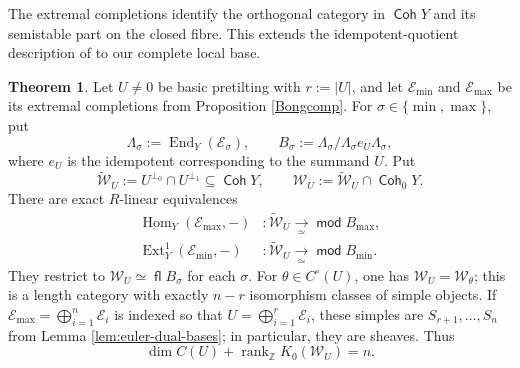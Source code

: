 \documentclass[a4paper,reqno]{amsart}
\def\E{\mathcal{E}}
\def\W{\mathcal{W}}
\DeclareMathOperator{\md}{\mathsf{mod}}
\renewcommand{\mod}{\md}
\DeclareMathOperator{\fl}{\mathsf{fl}}
\DeclareMathOperator{\Coh}{\mathsf{Coh}}
\DeclareMathOperator{\Hom}{Hom}
\DeclareMathOperator{\End}{End}
\DeclareMathOperator{\Ext}{Ext}
\theoremstyle{definition}
\newtheorem{Thm}{Theorem}[section]
\begin{document}
The extremal completions identify the orthogonal category in $\Coh Y$ and its semistable part on the closed fibre. This extends the idempotent-quotient description of \cite[Proposition 4.1]{Asa21} to our complete local base.

\begin{Thm}\label{thm:semistable-reduction}
Let $U\ne0$ be basic pretilting with $r:=|U|$, and let $\E_{\min}$ and $\E_{\max}$ be its extremal completions from Proposition \ref{Bongcomp}. For $\sigma\in\{\min,\max\}$, put
\[
\Lambda_\sigma:=\End_Y(\E_\sigma),
\qquad
B_\sigma:=\Lambda_\sigma/\Lambda_\sigma e_U\Lambda_\sigma,
\]
where $e_U$ is the idempotent corresponding to the summand $U$. Put
\[
\widetilde{\W}_U:=U^{\perp_0}\cap U^{\perp_1}\subseteq\Coh Y,
\qquad
\W_U:=\widetilde{\W}_U\cap\Coh_0Y.
\]
There are exact $R$-linear equivalences
\begin{equation}\label{eq:semistable-reduction-equivalences}
\begin{aligned}
\Hom_Y(\E_{\max},-)&\colon\widetilde{\W}_U\xrightarrow[\simeq]{}\mod B_{\max},\\
\Ext_Y^1(\E_{\min},-)&\colon\widetilde{\W}_U\xrightarrow[\simeq]{}\mod B_{\min}.
\end{aligned}
\end{equation}
They restrict to $\W_U\simeq\fl B_\sigma$ for each $\sigma$. For $\theta\in C^\circ(U)$, one has $\W_U=\W_\theta$; this is a length category with exactly $n-r$ isomorphism classes of simple objects. If $\E_{\max}=\bigoplus_{i=1}^n\E_i$ is indexed so that $U=\bigoplus_{i=1}^r\E_i$, these simples are $S_{r+1},\ldots,S_n$ from Lemma \ref{lem:euler-dual-bases}; in particular, they are sheaves. Thus
\[
\dim C(U)+\operatorname{rank}_{\mathbb Z}K_0(\W_U)=n.
\]
\end{Thm}
\end{document}
